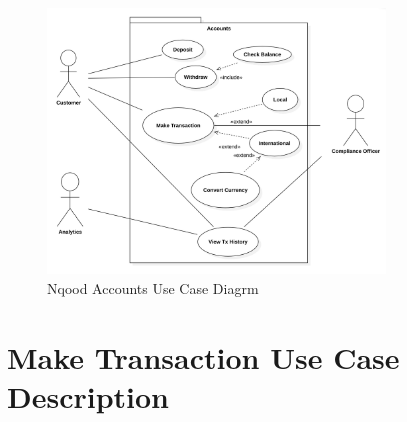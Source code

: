 \documentclass[a4paper]{report}
\begin{document}
\begin{figure}[h!]
    \centering
    \includegraphics[width=0.8\textwidth]{images/nqood-accounts-use-case-diagram.png}
    \caption{Nqood Accounts Use Case Diagrm}
    \label{fig:nqood-accounts-use-case-diagram}
\end{figure}

\newpage

\section{Make Transaction Use Case Description}
\end{document}
